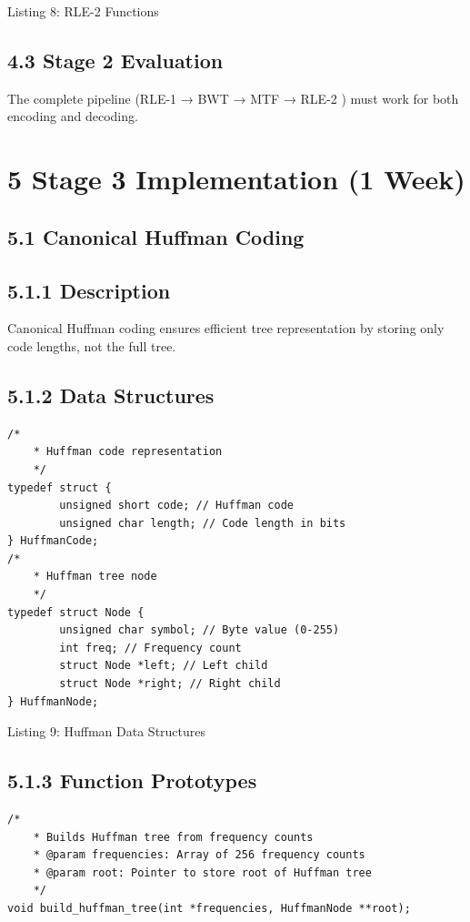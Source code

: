 \documentclass[10pt]{article}
\begin{document}
Listing 8: RLE-2 Functions

\subsection*{4.3 Stage 2 Evaluation}
The complete pipeline (RLE-1 → BWT → MTF → RLE-2 ) must work for both encoding and decoding.

\section*{5 Stage 3 Implementation (1 Week)}
\subsection*{5.1 Canonical Huffman Coding}
\subsection*{5.1.1 Description}
Canonical Huffman coding ensures efficient tree representation by storing only code lengths, not the full tree.

\subsection*{5.1.2 Data Structures}
\begin{verbatim}
/*
    * Huffman code representation
    */
typedef struct {
        unsigned short code; // Huffman code
        unsigned char length; // Code length in bits
} HuffmanCode;
/*
    * Huffman tree node
    */
typedef struct Node {
        unsigned char symbol; // Byte value (0-255)
        int freq; // Frequency count
        struct Node *left; // Left child
        struct Node *right; // Right child
} HuffmanNode;
\end{verbatim}

Listing 9: Huffman Data Structures

\subsection*{5.1.3 Function Prototypes}
\begin{verbatim}
/*
    * Builds Huffman tree from frequency counts
    * @param frequencies: Array of 256 frequency counts
    * @param root: Pointer to store root of Huffman tree
    */
void build_huffman_tree(int *frequencies, HuffmanNode **root);
\end{verbatim}
\end{document}
